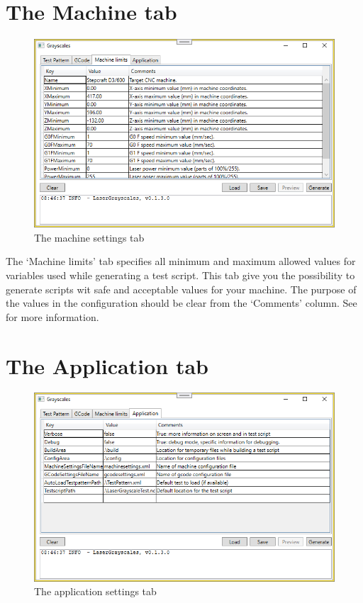 \section{The Machine tab}\label{MachineTab}
\begin{figure}[h!]
    \centering
    \includegraphics[width=0.8\linewidth]{./images/Machine-limits.png}
    \caption{The machine settings tab}
\end{figure}

The `Machine limits' tab specifies all minimum and maximum allowed values for variables used while generating a test script. This tab give you the possibility to generate
scripts wit safe and acceptable values for your machine. The purpose of the values in the configuration should be clear from the `Comments' column. See 
for more information.

\section{The Application tab}\label{ApplicationTab}
\begin{figure}[h!]
    \centering
    \includegraphics[width=0.8\linewidth]{./images/Application.png}
    \caption{The application settings tab}
\end{figure}

